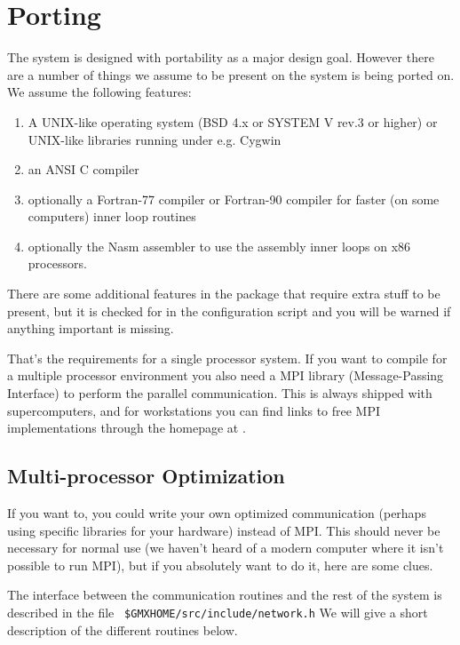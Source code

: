 \section{Porting {\gromacs}}
The {\gromacs} system is designed with portability as a major design
goal. However there are a number of things we assume to be present on
the system {\gromacs} is being ported on. We assume the following
features:

\begin{enumerate}
\item   A UNIX-like operating system (BSD 4.x or SYSTEM V rev.3 or higher) 
        or UNIX-like libraries running under e.g. Cygwin
\item   an ANSI C compiler 
\item   optionally a Fortran-77 compiler or Fortran-90 compiler
        for faster (on some computers) inner loop routines
\item   optionally the Nasm assembler to use the assembly inner loops
        on x86 processors.
\end{enumerate}

There are some additional features in the package that require extra
stuff to be present, but it is checked for in the configuration script
and you will be warned if anything important is missing.

That's the requirements for a single processor system. If you want
to compile {\gromacs} for a multiple processor environment you also
need a MPI library (Message-Passing Interface) to perform the 
parallel communication. This is always shipped with supercomputers, and
for workstations you can find links to free MPI implementations through
the {\gromacs} homepage at {\wwwpage}.

\subsection{Multi-processor Optimization}

If you want to, you could write your own optimized communication
(perhaps using specific libraries for your hardware) instead
of MPI. This should never be necessary for normal use
(we haven't heard of a modern computer where it isn't possible
to run MPI), but if you absolutely want to do it, here are some clues.

The interface between the communication routines and the
rest of the {\gromacs} system is described in the file {\tt
\$GMXHOME/src/include/network.h} We will give a short description of the
different routines below.

